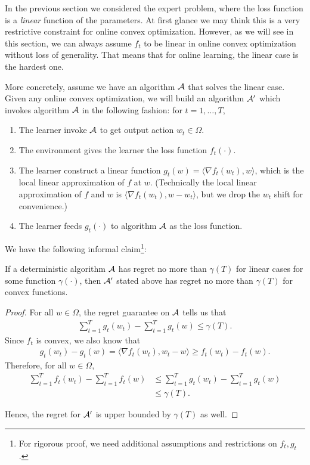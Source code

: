 
In the previous section we considered the expert problem, where the loss function is a \textit{linear} function of the parameters. At first glance we may think this is a very restrictive constraint for online convex optimization. However, as we will see in this section, we can always assume $f_t$ to be linear in online convex optimization without loss of generality. That means that for online learning, the linear case is the hardest one. 

More concretely, assume we have an algorithm $\mathcal A$ that solves the linear case. Given any online convex optimization, we will build an algorithm $\mathcal A'$ which invokes algorithm $\mathcal A$ in the following fashion: for $t = 1, \dots, T$,
\begin{enumerate}
	\item The learner invoke $\mathcal A$ to get output action $w_t \in \Omega$. 
	\item The environment gives the learner the loss function $f_t(\cdot)$. 
	\item The learner construct a linear function $g_t(w) = \langle\nabla f_t(w_t), w \rangle$, which is the local linear approximation of $f$ at $w$. (Technically the local linear approximation of $f$ and $w$ is $\langle \nabla f_t(w_t), w - w_t\rangle$, but we drop the $w_t$ shift for convenience.)
	\item The learner feeds $g_t(\cdot)$ to algorithm $\mathcal A$ as the loss function. 
\end{enumerate}

We have the following informal claim\footnote{For rigorous proof, we need additional assumptions and restrictions on $f_t, g_t$.}:
\begin{proposition}[Informal]
	If a deterministic algorithm $\mathcal A$ has regret no more than $\gamma (T)$ for linear cases for some function $\gamma (\cdot)$, then $\mathcal A'$ stated above has regret no more than $\gamma(T)$ for convex functions. 
\end{proposition}

\begin{proof}
	For all $w \in \Omega$, the regret guarantee on $\mathcal A$ tells us that
	\begin{align}
		\sum_{t=1}^T g_t(w_t) - \sum_{t=1}^T g_t(w) \leq \gamma(T).
	\end{align}
	Since $f_t$ is convex, we also know that
	\begin{align}
		g_t(w_t) - g_t(w) = \langle \nabla f_t(w_t), w_t- w \rangle \geq f_t(w_t) - f_t(w).
	\end{align}
	Therefore, for all $w \in \Omega$,
	\begin{align}
		\sum_{t=1}^T f_t(w_t) - \sum_{t=1}^Tf_t(w) &\leq \sum_{t=1}^T g_t(w_t) - \sum_{t=1}^T g_t(w) \\
		&\leq \gamma(T).
	\end{align}
	
	Hence, the regret for $\mathcal A'$ is upper bounded by $\gamma(T)$ as well.
\end{proof}

